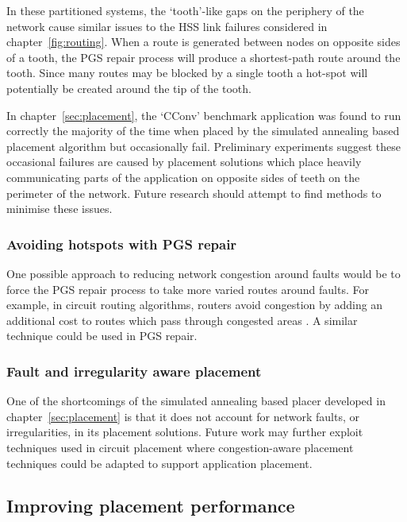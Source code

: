 			In these partitioned systems, the `tooth'-like gaps on the periphery of
			the network cause similar issues to the HSS link failures considered in
			chapter~\ref{fig:routing}. When a route is generated between nodes on
			opposite sides of a tooth, the PGS repair process will produce a
			shortest-path route around the tooth. Since many routes may be blocked by
			a single tooth a hot-spot will potentially be created around the tip of
			the tooth.
			
			In chapter~\ref{sec:placement}, the `CConv' benchmark application was
			found to run correctly the majority of the time when placed by the
			simulated annealing based placement algorithm but occasionally fail.
			Preliminary experiments suggest these occasional failures are caused by
			placement solutions which place heavily communicating parts of the
			application on opposite sides of teeth on the perimeter of the network.
			Future research should attempt to find methods to minimise these issues.
			
			\subsubsection{Avoiding hotspots with PGS repair}
				
				One possible approach to reducing network congestion around faults
				would be to force the PGS repair process to take more varied routes
				around faults. For example, in circuit routing algorithms, routers
				avoid congestion by adding an additional cost to routes which pass
				through congested areas \cite{kahng11}. A similar technique could be
				used in PGS repair.
			
			\subsubsection{Fault and irregularity aware placement}
				
				One of the shortcomings of the simulated annealing based placer
				developed in chapter~\ref{sec:placement} is that it does not account
				for network faults, or irregularities, in its placement solutions.
				Future work may further exploit techniques used in circuit placement
				where congestion-aware placement techniques \cite{viswanathan07} could
				be adapted to support application placement.
		
		\subsection{Improving placement performance}
			
